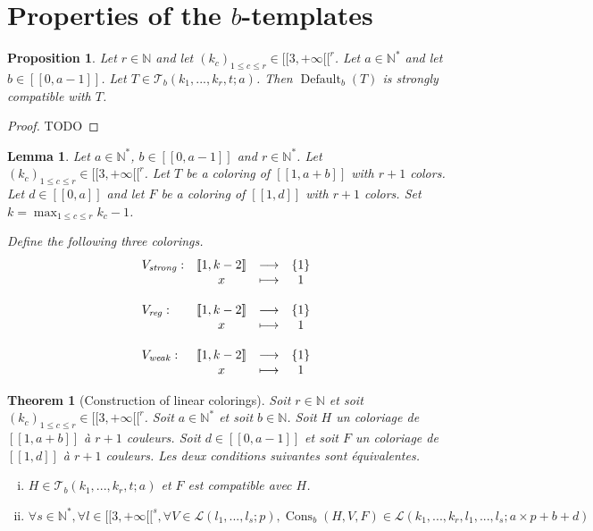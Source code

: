 \documentclass{article}
\newtheorem{theorem}[definition]{Theorem}
\newtheorem{lemma}[definition]{Lemma}
\newtheorem{proposition}[definition]{Proposition}
\DeclareMathOperator{\cons}{Cons}
\DeclareMathOperator{\coldef}{Default}
\begin{document}
\section{Properties of the \(b\)-templates}
\label{sec:results}

\begin{proposition}
Let \(r \in \mathbb{N}\) and let \((k_c)_{1 \leqslant c \leqslant r}  \in {[\![3, +\infty[\![}^r\). Let 
\(a \in \mathbb{N}^*\) and let \(b \in [\![0, a - 1]\!]\). Let \(T \in \mathcal{T}_b(k_1, ..., k_r, t; a)\). Then 
\(\coldef_b(T)\) is strongly compatible with \(T\).
\end{proposition}

\begin{proof}
TODO
\end{proof}

\begin{lemma}
Let \(a \in \mathbb{N}^*\), \(b \in [\![0, a - 1 ]\!]\) and \(r \in \mathbb{N}^*\). Let 
\((k_c)_{1 \leqslant c \leqslant r} \in {[\![3, + \infty [\![}^r\). Let \(T\) be a coloring of \([\![1,  a + b]\!]\) 
with \(r + 1\) colors. Let \(d \in [\![0, a]\!]\) and let \(F\) be a coloring of \([\![1, d]\!]\) with \(r + 1\) 
colors. Set \(k = \max_{1 \leqslant c \leqslant r} k_c - 1\).

Define the following three colorings.
\[\begin{array}{l c c c l}
	V_\mathit{strong} : & [\![1, k - 2]\!] & \longrightarrow & \{1\} & \\
	 & x & \longmapsto & 1 & \\
	 & & & & \\
	V_\mathit{reg} : & [\![1, k - 2]\!] & \longrightarrow & \{1\} & \\
	 & x & \longmapsto & 1 & \\
	 & & & & \\
	V_\mathit{weak} : & [\![1, k - 2]\!] & \longrightarrow & \{1\} & \\
	 & x & \longmapsto & 1 & \\
\end{array}\]
\end{lemma}

\begin{theorem}[Construction of linear colorings]
\label{thm:b-temp}
Soit \(r \in \mathbb{N}\) et soit \((k_c)_{1 \leqslant c \leqslant r} \in {[\![3, +\infty[\![}^r\). Soit \(a \in \mathbb{N}^*\) et soit \(b \in \mathbb{N}\). Soit \(H\) un coloriage de \([\![1, a + b]\!]\) à \(r + 1\) couleurs. Soit \(d \in [\![0, a - 1]\!]\) et soit \(F\) un coloriage de \([\![1, d]\!]\) à \(r + 1\) couleurs. Les deux conditions suivantes sont équivalentes.

\begin{enumerate}[(i)]
\item \(H \in \mathcal{T}_b(k_1, ..., k_r, t; a)\) et \(F\) est compatible  avec \(H\).
\item \(\forall s \in \mathbb{N}^*, \forall l \in {[\![3, +\infty[\![}^s, \forall V \in \mathcal{L}(l_1, ..., l_s ; p), \cons_b(H, V, F) \in  \mathcal{L}(k_1, ..., k_r, l_1, ..., l_s ; a \times p + b + d)\)
\end{enumerate}
\end{theorem}
\end{document}
